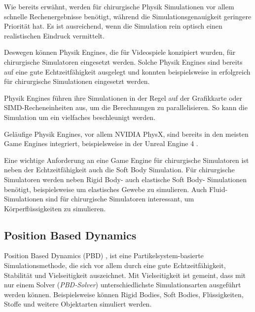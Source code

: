 Wie bereits erwähnt, werden für chirurgische Physik Simulationen vor allem schnelle Rechenergebnisse benötigt, während die Simulationsgenauigkeit geringere Priorität hat. Es ist ausreichend, wenn die Simulation rein optisch einen realistischen Eindruck vermittelt.


Deswegen können Physik Engines, die für Videospiele konzipiert wurden, für chirurgische Simulatoren eingesetzt werden. Solche Physik Engines sind bereits auf eine gute Echtzeitfähigkeit ausgelegt und konnten beispielsweise in \cite{SimUpdate} erfolgreich für chirurgische Simulationen eingesetzt werden. 

Physik Engines führen ihre Simulationen in der Regel auf der Grafikkarte oder SIMD-Recheneinheiten aus, um die Berechnungen zu parallelisieren. So kann die Simulation um ein vielfaches beschleunigt werden.

Geläufige Physik Engines, vor allem NVIDIA PhysX, sind bereits in den meisten Game Engines integriert, beispielsweise in der Unreal Engine 4 \cite{ue4physics}. 

Eine wichtige Anforderung an eine Game Engine für chirurgische Simulatoren ist neben der Echtzeitfähigkeit auch die Soft Body Simulation. Für chirurgische Simulatoren werden neben Rigid Body- auch elastische Soft Body- Simulationen benötigt, beispielsweise um elastisches Gewebe zu simulieren. Auch Fluid-Simulationen sind für chirurgische Simulatoren interessant, um Körperflüssigkeiten zu simulieren.

\subsection{Position Based Dynamics}
\label{section_PBD}

Position Based Dynamics (PBD) \cite{PBD}, ist eine Partikelsystem-basierte Simulationsmethode, die sich vor allem durch eine gute Echtzeitfähigkeit, Stabilität und Vielseitigkeit auszeichnet. Mit Vielseitigkeit ist gemeint, dass mit nur einem Solver (\textit{PBD-Solver}) unterschiedlichste Simulationsarten ausgeführt werden können. Beispielsweise können Rigid Bodies, Soft Bodies, Flüssigkeiten, Stoffe und weitere Objektarten simuliert werden. 

